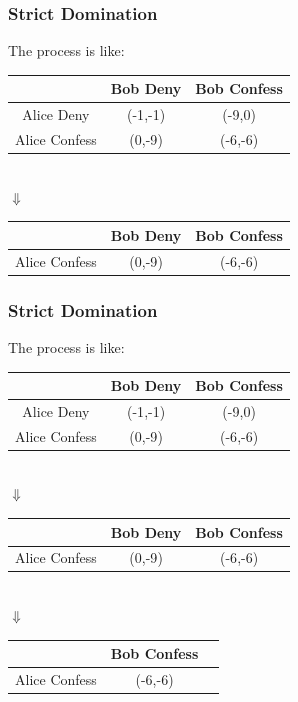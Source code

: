 \documentclass{beamer}
\begin{document}
\begin{frame}
\frametitle{Strict Domination}
The process is like:\\
\centering
\begin{tabular}{|c|c|c|}
\hline
\hline
    &{\color{red}Bob} Deny&{\color{red}Bob} Confess\\
\hline
{\color{blue}Alice} Deny& ({\color{blue}-1},{\color{red}-1}) & ({\color{blue}-9},{\color{red}0})\\
\hline
{\color{blue}Alice} Confess& ({\color{blue}0},{\color{red}-9}) & ({\color{blue}-6},{\color{red}-6})\\
\hline
\hline
\end{tabular}\\
$\Downarrow$\\
\begin{tabular}{|c|c|c|}
\hline
\hline
    &{\color{red}Bob} Deny&{\color{red}Bob} Confess\\
\hline
{\color{blue}Alice} Confess& ({\color{blue}0},{\color{red}-9}) & ({\color{blue}-6},{\color{red}-6})\\
\hline
\hline
\end{tabular}
\end{frame}

\begin{frame}
\frametitle{Strict Domination}
The process is like:\\
\centering
\begin{tabular}{|c|c|c|}
\hline
\hline
    &{\color{red}Bob} Deny&{\color{red}Bob} Confess\\
\hline
{\color{blue}Alice} Deny& ({\color{blue}-1},{\color{red}-1}) & ({\color{blue}-9},{\color{red}0})\\
\hline
{\color{blue}Alice} Confess& ({\color{blue}0},{\color{red}-9}) & ({\color{blue}-6},{\color{red}-6})\\
\hline
\hline
\end{tabular}\\
$\Downarrow$\\
\begin{tabular}{|c|c|c|}
\hline
\hline
    &{\color{red}Bob} Deny&{\color{red}Bob} Confess\\
\hline
{\color{blue}Alice} Confess& ({\color{blue}0},{\color{red}-9}) & ({\color{blue}-6},{\color{red}-6})\\
\hline
\hline
\end{tabular}\\
$\Downarrow$\\
\begin{tabular}{|c|c|c|}
\hline
\hline
    &{\color{red}Bob} Confess\\
\hline
{\color{blue}Alice} Confess&  ({\color{blue}-6},{\color{red}-6})\\
\hline
\hline
\end{tabular}
\end{frame}
\end{document}
